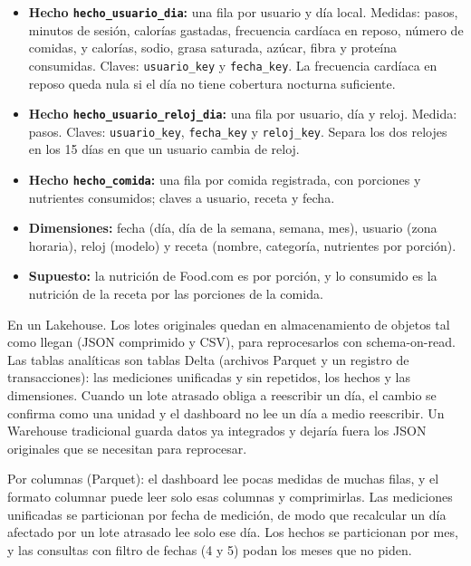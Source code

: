 \documentclass[11pt]{article}
\begin{document}
\begin{itemize}
  \item \textbf{Hecho \texttt{hecho\_usuario\_dia}:} una fila por usuario y día
  local. Medidas: pasos, minutos de sesión, calorías gastadas, frecuencia
  cardíaca en reposo, número de comidas, y calorías, sodio, grasa saturada,
  azúcar, fibra y proteína consumidas. Claves: \texttt{usuario\_key} y
  \texttt{fecha\_key}. La frecuencia cardíaca en reposo queda nula si el día no
  tiene cobertura nocturna suficiente.
  \item \textbf{Hecho \texttt{hecho\allowbreak\_usuario\allowbreak\_reloj\allowbreak\_dia}:} una fila por usuario, día y reloj. Medida: pasos. Claves: \texttt{usuario\_key},
  \texttt{fecha\_key} y \texttt{reloj\_key}. Separa los dos relojes en los 15 días en que un usuario cambia de reloj.
  \item \textbf{Hecho \texttt{hecho\_comida}:} una fila por comida registrada,
  con porciones y nutrientes consumidos; claves a usuario, receta y fecha.
  \item \textbf{Dimensiones:} fecha (día, día de la semana, semana, mes),
  usuario (zona horaria), reloj (modelo) y receta (nombre, categoría,
  nutrientes por porción).
  \item \textbf{Supuesto:} la nutrición de Food.com es por porción, y lo consumido es la nutrición de la receta por las porciones de la comida.
\end{itemize}

 En un
Lakehouse. Los lotes originales quedan en almacenamiento de objetos tal como
llegan (JSON comprimido y CSV), para reprocesarlos con schema-on-read. Las tablas analíticas son tablas Delta (archivos Parquet y un registro de transacciones): las mediciones unificadas y sin repetidos, los hechos y las dimensiones. Cuando un lote atrasado obliga a reescribir un
día, el cambio se confirma como una unidad y el dashboard no lee un día a medio reescribir. Un Warehouse tradicional guarda datos ya integrados y dejaría fuera los
JSON originales que se necesitan para reprocesar.

 Por columnas
(Parquet): el dashboard lee pocas medidas de muchas filas, y el formato columnar puede leer solo esas columnas y comprimirlas. Las mediciones unificadas se particionan por fecha de medición, de modo que recalcular un día afectado por
un lote atrasado lee solo ese día. Los hechos se particionan por mes, y las consultas con filtro de fechas (4 y 5) podan los meses que no piden.
\end{document}
